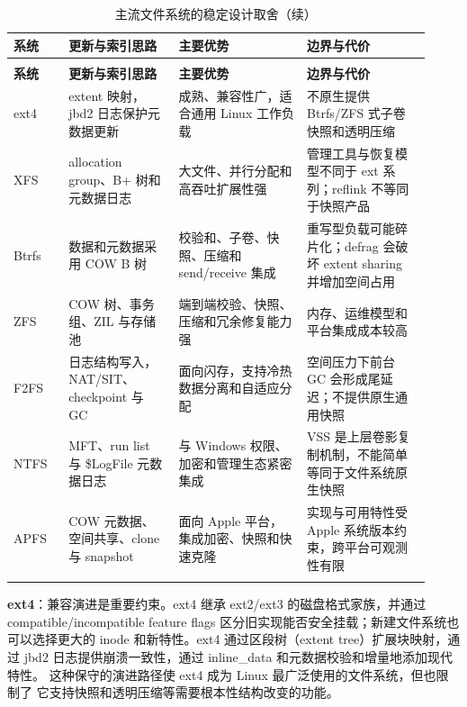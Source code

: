 \begin{filesystemlayout}
\begingroup
\small
\setlength{\tabcolsep}{3pt}
\begin{longtable}{|F{0.12\linewidth}|F{0.24\linewidth}|F{0.29\linewidth}|F{0.27\linewidth}|}
\caption{主流文件系统的稳定设计取舍}\\
\toprule
{}
\textbf{系统} & \textbf{更新与索引思路} & \textbf{主要优势} & \textbf{边界与代价} \\
\midrule
\endfirsthead
\caption[]{主流文件系统的稳定设计取舍（续）}\\
\toprule
{}
\textbf{系统} & \textbf{更新与索引思路} & \textbf{主要优势} & \textbf{边界与代价} \\
\midrule
\endhead
\bottomrule
\endfoot
ext4 & extent 映射，jbd2 日志保护元数据更新 & 成熟、兼容性广，适合通用 Linux 工作负载 & 不原生提供 Btrfs/ZFS 式子卷快照和透明压缩 \\\tablerowrule
XFS & allocation group、B+ 树和元数据日志 & 大文件、并行分配和高吞吐扩展性强 & 管理工具与恢复模型不同于 ext 系列；reflink 不等同于快照产品 \\\tablerowrule
Btrfs & 数据和元数据采用 COW B 树 & 校验和、子卷、快照、压缩和 send/receive 集成 & 重写型负载可能碎片化；defrag 会破坏 extent sharing 并增加空间占用 \\\tablerowrule
ZFS & COW 树、事务组、ZIL 与存储池 & 端到端校验、快照、压缩和冗余修复能力强 & 内存、运维模型和平台集成成本较高 \\\tablerowrule
F2FS & 日志结构写入，NAT/SIT、checkpoint 与 GC & 面向闪存，支持冷热数据分离和自适应分配 & 空间压力下前台 GC 会形成尾延迟；不提供原生通用快照 \\\tablerowrule
NTFS & MFT、run list 与 \$LogFile 元数据日志 & 与 Windows 权限、加密和管理生态紧密集成 & VSS 是上层卷影复制机制，不能简单等同于文件系统原生快照 \\\tablerowrule
APFS & COW 元数据、空间共享、clone 与 snapshot & 面向 Apple 平台，集成加密、快照和快速克隆 & 实现与可用特性受 Apple 系统版本约束，跨平台可观测性有限 \\\tablerowrule
\end{longtable}
\endgroup


\noindent\textbf{ext4}：兼容演进是重要约束。ext4 继承 ext2/ext3 的磁盘格式家族，并通过 compatible/incompatible feature flags 区分旧实现能否安全挂载；新建文件系统也可以选择更大的 inode 和新特性。ext4 通过区段树（extent tree）扩展块映射，通过 jbd2
日志提供崩溃一致性，通过 inline\_data 和元数据校验和增量地添加现代特性。
这种保守的演进路径使 ext4 成为 Linux 最广泛使用的文件系统，但也限制了
它支持快照和透明压缩等需要根本性结构改变的功能。


\end{filesystemlayout}
